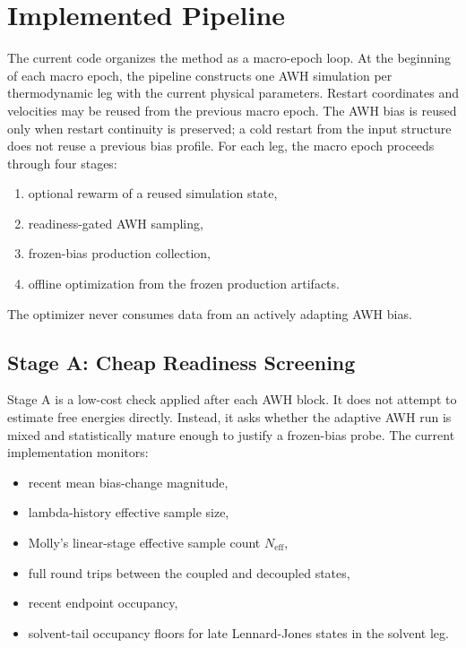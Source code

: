 \section{Implemented Pipeline}

The current code organizes the method as a macro-epoch loop. At the beginning of each macro epoch, the pipeline constructs one AWH simulation per thermodynamic leg with the current physical parameters. Restart coordinates and velocities may be reused from the previous macro epoch. The AWH bias is reused only when restart continuity is preserved; a cold restart from the input structure does not reuse a previous bias profile. For each leg, the macro epoch proceeds through four stages:

\begin{enumerate}
    \item optional rewarm of a reused simulation state,
    \item readiness-gated AWH sampling,
    \item frozen-bias production collection,
    \item offline optimization from the frozen production artifacts.
\end{enumerate}
%
The optimizer never consumes data from an actively adapting AWH bias.

\subsection{Stage A: Cheap Readiness Screening}

Stage A is a low-cost check applied after each AWH block. It does not attempt to estimate free energies directly. Instead, it asks whether the adaptive AWH run is mixed and statistically mature enough to justify a frozen-bias probe. The current implementation monitors:

\begin{itemize}
    \item recent mean bias-change magnitude,
    \item lambda-history effective sample size,
    \item Molly's linear-stage effective sample count $N_{\mathrm{eff}}$,
    \item full round trips between the coupled and decoupled states,
    \item recent endpoint occupancy,
    \item solvent-tail occupancy floors for late Lennard-Jones states in the
    solvent leg.
\end{itemize}

